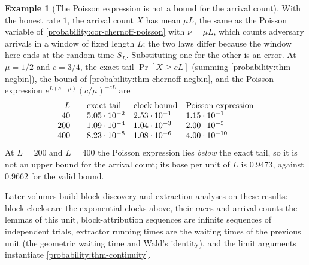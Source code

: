 \documentclass[11pt,a4paper]{article}
\theoremstyle{definition}
\newtheorem{example}[theorem]{Example}
\theoremstyle{remark}
\begin{document}
\begin{example}[The Poisson expression is not a bound for the
arrival count]\label{probability:exp-negbin-tail}
With the honest rate \(1\), the arrival count \(X\) has mean
\(\mu L\), the same as the Poisson variable of
\cref{probability:cor-chernoff-poisson} with \(\nu = \mu L\), which
counts adversary arrivals in a window of fixed length \(L\); the two
laws differ because the window here ends at the random time
\(S_L\). Substituting one for the other is an error. At
\(\mu = 1/2\) and \(c = 3/4\), the exact tail \(\Pr[X \ge cL]\)
(summing \cref{probability:thm-negbin}), the bound of
\cref{probability:thm-chernoff-negbin}, and the Poisson expression
\(e^{L(c - \mu)}(c/\mu)^{-cL}\) are
\[
\begin{array}{r@{\qquad}lll}
L & \text{exact tail} & \text{clock bound} & \text{Poisson expression} \\
40  & 5.05 \cdot 10^{-2} & 2.53 \cdot 10^{-1} & 1.15 \cdot 10^{-1} \\
200 & 1.09 \cdot 10^{-4} & 1.04 \cdot 10^{-3} & 2.00 \cdot 10^{-5} \\
400 & 8.23 \cdot 10^{-8} & 1.08 \cdot 10^{-6} & 4.00 \cdot 10^{-10}
\end{array}
\]
At \(L = 200\) and \(L = 400\) the Poisson expression lies
\emph{below} the exact tail, so it is not an upper bound for the
arrival count; its base per unit of \(L\) is \(0.9473\), against
\(0.9662\) for the valid bound.
\end{example}

Later volumes build block-discovery and extraction analyses on these
results: block clocks are the exponential clocks above, their races and
arrival counts the lemmas of this unit, block-attribution sequences are
infinite sequences of independent trials, extractor running times are
the waiting times of the previous unit (the geometric waiting time and
Wald's identity), and the limit arguments instantiate
\cref{probability:thm-continuity}.
\end{document}
